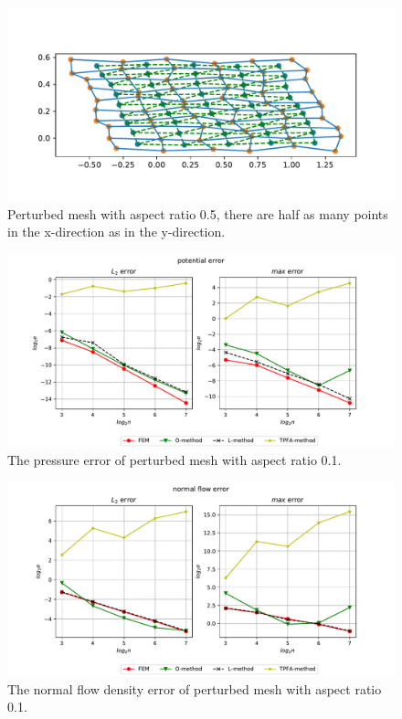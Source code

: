 \documentclass[../Main/main.tex]{subfiles}
\begin{document}
		\begin{figure}[H]
			\centering
			\includegraphics[width=1\textwidth]{mesh_perturbed_1d2.pdf}
			\caption{Perturbed mesh with aspect ratio 0.5, there are half as many points in the x-direction as in the y-direction.}
			\label{fig:mesh_perturbed_1d2}
		\end{figure}
		\begin{figure}[H]
		\advance\leftskip-1cm
			\includegraphics[width=1.2\textwidth]{pressure_perturbed_1d10.pdf}
			\caption{The pressure error of perturbed mesh with aspect ratio 0.1.}
			\label{fig:mesh_perturbed_potential_1d10}
		\end{figure}
			\begin{figure}[H]
			\advance\leftskip-1cm
			\includegraphics[width=1.2\textwidth]{flow_perturbed_1d10.pdf}
			\caption{The normal flow density error of perturbed mesh with aspect ratio 0.1.}
			\label{fig:mesh_perturbed_flow_1d10}
		\end{figure}
\end{document}
